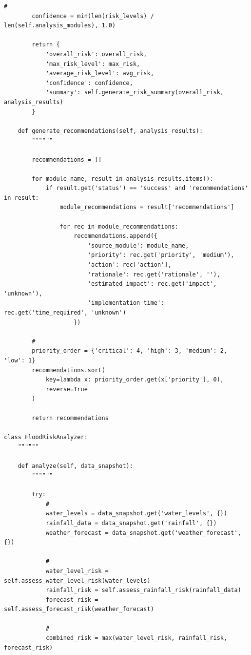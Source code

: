 \begin{lstlisting}[style=python]
        # 
        confidence = min(len(risk_levels) / len(self.analysis_modules), 1.0)
        
        return {
            'overall_risk': overall_risk,
            'max_risk_level': max_risk,
            'average_risk_level': avg_risk,
            'confidence': confidence,
            'summary': self.generate_risk_summary(overall_risk, analysis_results)
        }
    
    def generate_recommendations(self, analysis_results):
        """"""
        
        recommendations = []
        
        for module_name, result in analysis_results.items():
            if result.get('status') == 'success' and 'recommendations' in result:
                module_recommendations = result['recommendations']
                
                for rec in module_recommendations:
                    recommendations.append({
                        'source_module': module_name,
                        'priority': rec.get('priority', 'medium'),
                        'action': rec['action'],
                        'rationale': rec.get('rationale', ''),
                        'estimated_impact': rec.get('impact', 'unknown'),
                        'implementation_time': rec.get('time_required', 'unknown')
                    })
        
        # 
        priority_order = {'critical': 4, 'high': 3, 'medium': 2, 'low': 1}
        recommendations.sort(
            key=lambda x: priority_order.get(x['priority'], 0),
            reverse=True
        )
        
        return recommendations

class FloodRiskAnalyzer:
    """"""
    
    def analyze(self, data_snapshot):
        """"""
        
        try:
            # 
            water_levels = data_snapshot.get('water_levels', {})
            rainfall_data = data_snapshot.get('rainfall', {})
            weather_forecast = data_snapshot.get('weather_forecast', {})
            
            # 
            water_level_risk = self.assess_water_level_risk(water_levels)
            rainfall_risk = self.assess_rainfall_risk(rainfall_data)
            forecast_risk = self.assess_forecast_risk(weather_forecast)
            
            # 
            combined_risk = max(water_level_risk, rainfall_risk, forecast_risk)
            

\end{lstlisting}
